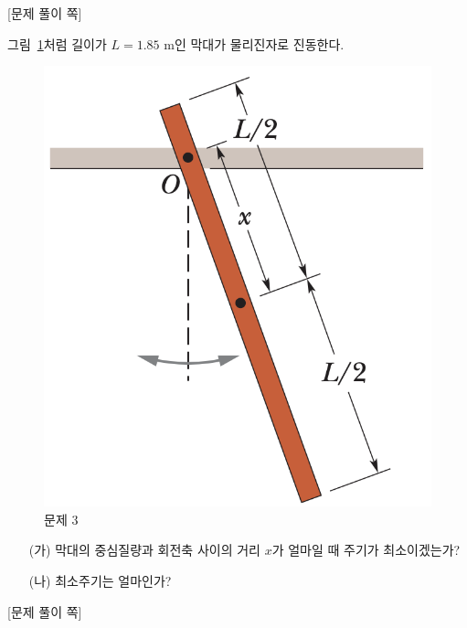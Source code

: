 \documentclass[floatfix,nofootinbib,superscriptaddress,fleqn,preprint]{revtex4-2}
\begin{document}
\newpage
{\color{gray} [문제 풀이 쪽]}

\newpage

그림~\ref{fig:2}처럼 길이가 $L=1.85$ m인 막대가 물리진자로 진동한다.
\begin{figure}[ht]
  \centering
\includegraphics[scale=0.45]{Qfig18-2-20220511.png}
  \caption{문제 3}
  \label{fig:2}
\end{figure}
\begin{itemize}
\item[(가)] 막대의 중심질량과 회전축 사이의 거리 $x$가 얼마일 때
  주기가 최소이겠는가?
\item[(나)] 최소주기는 얼마인가?  
\end{itemize}
\newpage
{\color{gray} [문제 풀이 쪽]}

\newpage
\end{document}
